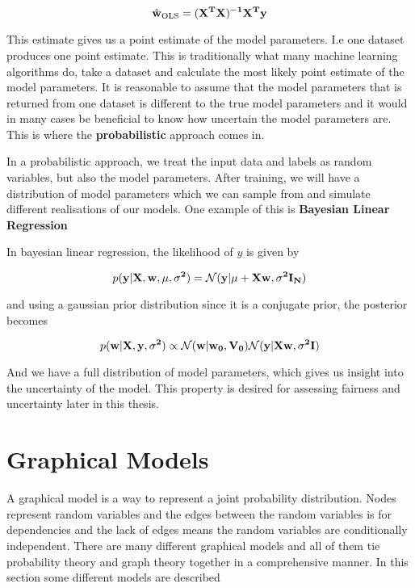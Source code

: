 \begin{equation*}
    \hat{\bf{w}}_{\text{OLS}} = (\bf{X}^T\bf{X})^{-1}\bf{X}^T\bf{y}
\end{equation*}

This estimate gives us a point estimate of the model parameters. I.e one dataset produces one point estimate. This is traditionally what many machine learning algorithms do, take a dataset and calculate the most likely point estimate of the model parameters. It is reasonable to assume that the model parameters that is returned from one dataset is different to the true model parameters and it would in many cases be beneficial to know how uncertain the model parameters are. This is where the \textbf{probabilistic} approach comes in.

In a probabilistic approach, we treat the input data and labels as random variables, but also the model parameters. After training, we will have a distribution of model parameters which we can sample from and simulate different realisations of our models. One example of this is \textbf{Bayesian Linear Regression}

In bayesian linear regression, the likelihood of $y$ is given by \cite[p.~232]{Murphy:2012:Book}

\begin{equation*}
    p(\bf{y}|\bf{X}, \bf{w}, \mu, \sigma^2) = \mathcal{N}(\bf{y}|\mu + \bf{X}\bf{w}, \sigma^2 \bf{I}_N)
\end{equation*}

and using a gaussian prior distribution since it is a conjugate prior, the posterior becomes \cite[p.~232]{Murphy:2012:Book}

\begin{equation*}
    p(\bf{w}|\bf{X}, \bf{y}, \sigma^2) \propto \mathcal{N}(\bf{w}|\bf{w_0}, \bf{V_0}) \mathcal{N}(\bf{y}|\bf{Xw}, \sigma^2\bf{I})
\end{equation*}

And we have a full distribution of model parameters, which gives us insight into the uncertainty of the model. This property is desired for assessing fairness and uncertainty later in this thesis.

\section{Graphical Models}

A graphical model is a way to represent a joint probability distribution. Nodes represent random variables and the edges between the random variables is for dependencies and the lack of edges means the random variables are conditionally independent. \cite[p.~308]{Murphy:2012:Book} There are many different graphical models and all of them tie probability theory and graph theory together in a comprehensive manner. In this section some different models are described

